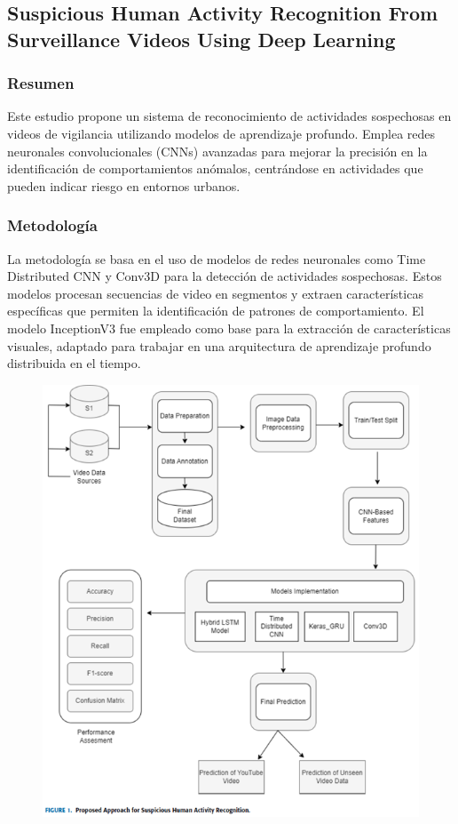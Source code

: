 \subsection{Suspicious Human Activity Recognition From Surveillance Videos Using Deep Learning}

\subsubsection{Resumen}
Este estudio propone un sistema de reconocimiento de actividades sospechosas en videos de vigilancia utilizando modelos de aprendizaje profundo. Emplea redes neuronales convolucionales (CNNs) avanzadas para mejorar la precisión en la identificación de comportamientos anómalos, centrándose en actividades que pueden indicar riesgo en entornos urbanos.

\subsubsection{Metodología}
La metodología se basa en el uso de modelos de redes neuronales como Time Distributed CNN y Conv3D para la detección de actividades sospechosas. Estos modelos procesan secuencias de video en segmentos y extraen características específicas que permiten la identificación de patrones de comportamiento. El modelo InceptionV3 fue empleado como base para la extracción de características visuales, adaptado para trabajar en una arquitectura de aprendizaje profundo distribuida en el tiempo.

\begin{figure}[h] %
    \centering
    \includegraphics[width=1.0\textwidth]{4/met7.png} %
    \label{fig:ejemplo} %
\end{figure}


